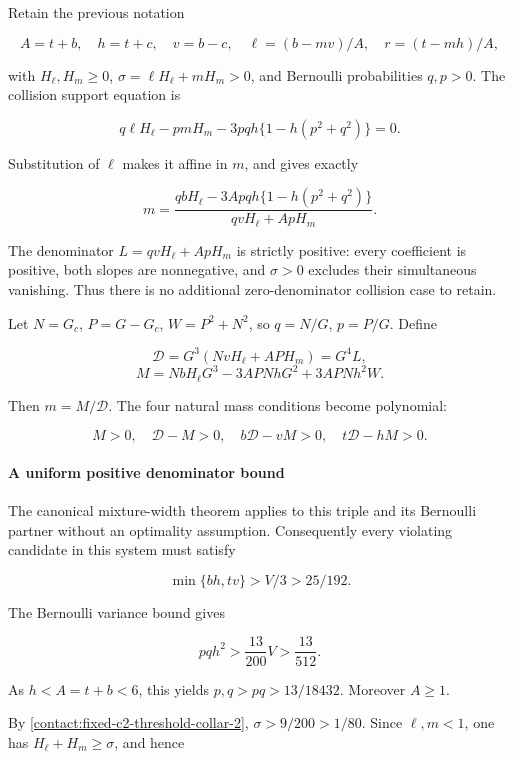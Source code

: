 Retain the previous notation

\[
 A=t+b,\quad h=t+c,\quad v=b-c,\quad
 \ell=(b-mv)/A,\quad r=(t-mh)/A,
\]

with $H_{\ell},H_m\ge 0$, $\sigma=\ell H_{\ell}+m H_m>0$, and Bernoulli probabilities
$q,p>0$. The collision support equation is

\[
 q\ell H_{\ell}-pmH_m-3pq h\{1-h(p^2+q^2)\}=0.
\]

Substitution of $\ell$ makes it affine in $m$, and gives exactly

\[
 \boxed{
 m=\frac{q b H_{\ell}-3A p q h\{1-h(p^2+q^2)\}}
           {qvH_{\ell}+A pH_m}.}
\tag{B.17.1}\label{contact:collision-210-mass-elimination-1}
\]

The denominator $L=qvH_{\ell}+A pH_m$ is strictly positive: every coefficient
is positive, both slopes are nonnegative, and $\sigma>0$ excludes their
simultaneous vanishing. Thus there is no additional zero-denominator
collision case to retain.

Let $N=G_c$, $P=G-G_c$, $W=P^2+N^2$, so $q=N/G$, $p=P/G$. Define

\[
 \mathcal D=G^3(NvH_{\ell}+A PH_m)=G^4 L,
\]
\[
 M=N bH_{\ell}G^3-3A PN hG^2+3A PN h^2W.
\tag{B.17.2}\label{contact:collision-210-mass-elimination-2}
\]

Then $m=M/\mathcal D$. The four natural mass conditions become polynomial:

\[
 M>0,\quad\mathcal D-M>0,\quad
 b\mathcal D-vM>0,\quad t\mathcal D-hM>0.
\tag{B.17.3}\label{contact:collision-210-mass-elimination-3}
\]

\paragraph{A uniform positive denominator bound}

The canonical mixture-width theorem applies to this triple and its
Bernoulli partner without an optimality assumption. Consequently every
violating candidate in this system must satisfy

\[
 \min\{bh,tv\}>V/3>25/192.
\tag{B.17.4}\label{contact:collision-210-mass-elimination-4}
\]

The Bernoulli variance bound gives

\[
 pq h^2>\frac{13}{200}V>\frac{13}{512}.
\]

As $h<A=t+b<6$, this yields
$p,q>pq>13/18432$. Moreover $A\ge 1$.

By \eqref{contact:fixed-c2-threshold-collar-2}, $\sigma>9/200>1/80$.
Since $\ell,m<1$, one has $H_{\ell}+H_m\ge \sigma$, and hence

